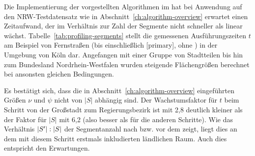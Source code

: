 \documentclass[../main/thesis.tex]{subfiles}
\begin{document}
Die Implementierung der vorgestellten Algorithmen im  hat bei Anwendung auf den NRW-Testdatensatz wie in Abschnitt~\ref{ch:algorithm-overview} erwartet einen Zeitaufwand, der im Verhältnis zur Zahl der Segmente nicht schneller als linear wächst.
Tabelle~\ref{tab:profiling-segments} stellt die gemessenen Ausführungszeiten $t$ am Beispiel von Fernstraßen (bis einschließlich [primary], ohne ) in der Umgebung von Köln dar.
Angefangen mit einer Gruppe von Stadtteilen bis hin zum Bundesland Nordrhein-Westfalen wurden steigende Flächengrößen berechnet bei ansonsten gleichen Bedingungen.


Es bestätigt sich, dass die in Abschnitt~\ref{ch:algorithm-overview} eingeführten Größen $\nu$ und $\psi$ nicht von $|S|$ abhängig sind.
Der Wachstumsfaktor für $t$ beim Schritt von der Großstadt zum Regierungsbezirk ist mit 2,8 deutlich kleiner als der Faktor für $|S|$ mit 6,2 (also besser als für die anderen Schritte).
Wie das Verhältnis $|S'|\nobreak:\nobreak|S|$ der Segmentanzahl nach bzw. vor dem  zeigt, liegt dies an dem mit diesem Schritt erstmals inkludierten ländlichen Raum.
Auch dies entspricht den Erwartungen.

\end{document}
